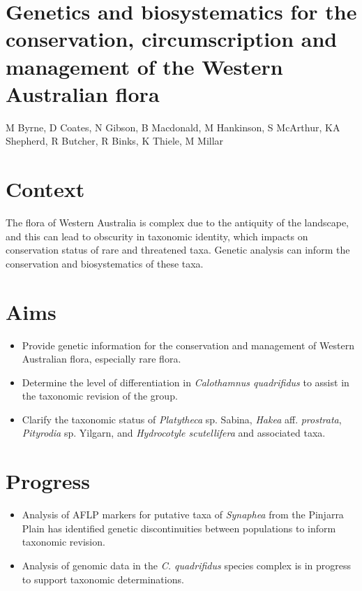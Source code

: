 \documentclass[version=last,
    paper=a4, %
    10pt, %
    usenames,
    dvipsnames,
    oneside, %
    headings=openany, %
    DIV=15 %
]{scrbook}
\begin{document}
\section*{Genetics and biosystematics for the conservation, circumscription and
management of the Western Australian flora
}

M Byrne, D Coates, N Gibson, B Macdonald, M Hankinson, S McArthur, KA
Shepherd, R Butcher, R Binks, K Thiele, M Millar


\section*{Context}
The flora of Western Australia is complex due to the antiquity of the
landscape, and this can lead to obscurity in taxonomic identity, which
impacts on conservation status of rare and threatened taxa. Genetic
analysis can inform the conservation and biosystematics of these taxa.



\section*{Aims}
\begin{itemize}
\itemsep1pt\parskip0pt
\item
  Provide genetic information for the conservation and management of
  Western Australian flora, especially rare flora.
\item
  Determine the level of differentiation in \emph{Calothamnus
  quadrifidus} to assist in the taxonomic revision of the group.
\item
  Clarify the taxonomic status of \emph{Platytheca} sp. Sabina,
  \emph{Hakea} aff. \emph{prostrata}, \emph{Pityrodia} sp. Yilgarn, and
  \emph{Hydrocotyle scutellifera} and associated taxa.
\end{itemize}



\section*{Progress}
\begin{itemize}
\itemsep1pt\parskip0pt
\item
  Analysis of AFLP markers for putative taxa of \emph{Synaphea} from the
  Pinjarra Plain has identified genetic discontinuities between
  populations to inform taxonomic revision.
\item
  Analysis of genomic data in the \emph{C. quadrifidus} species complex
  is in progress to support taxonomic determinations.
\end{itemize}
\end{document}

